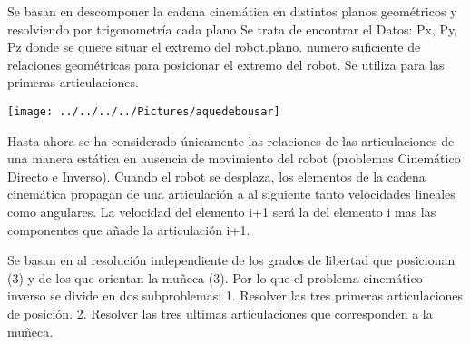 \documentclass[12pt,a4paper]{article}
\begin{document}
Se basan en descomponer la cadena cinemática en distintos planos geométricos y resolviendo por
trigonometría cada plano Se trata de encontrar el Datos: Px, Py, Pz donde se quiere situar el extremo del robot.plano. numero suficiente de relaciones geométricas para posicionar el extremo del robot. Se utiliza para las primeras articulaciones.

\texttt{[image: ../../../../Pictures/aquedebousar]} 

Hasta ahora se ha considerado únicamente las relaciones de las articulaciones de una manera estática en ausencia de movimiento del robot (problemas Cinemático Directo e Inverso).
Cuando el robot se desplaza, los elementos de la cadena cinemática propagan de una articulación a al siguiente tanto velocidades lineales como angulares.
La velocidad del elemento i+1 será la del elemento i mas las componentes que añade la articulación i+1.

Se basan en al resolución independiente de los grados de libertad que posicionan (3) y de los que orientan la muñeca (3).
Por lo que el problema cinemático inverso se divide en dos subproblemas:
1. Resolver las tres primeras articulaciones de posición.
2. Resolver las tres ultimas articulaciones que corresponden a la muñeca.
\end{document}
